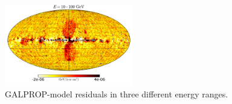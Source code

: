 \begin{figure}[h]
 \includegraphics[width=0.5\textwidth]{plots/Mollweide_GALPROP_source_range2.pdf}
 \caption{GALPROP-model residuals in three different energy ranges.}
 \label{fig:Maps_GALPROP}
\end{figure}
%
%
